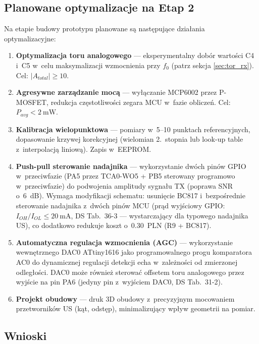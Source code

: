 \documentclass[a4paper,11pt]{article}
\begin{document}
\subsection{Planowane optymalizacje na Etap 2}

Na etapie budowy prototypu planowane są następujące działania optymalizacyjne:

\begin{enumerate}[nosep]
    \item \textbf{Optymalizacja toru analogowego} --- eksperymentalny dobór
          wartości C4 i~C5 w~celu maksymalizacji wzmocnienia przy $f_0$ (patrz
          sekcja \ref{sec:tor_rx}). Cel: $|A_{total}| \geq 10$.
    \item \textbf{Agresywne zarządzanie mocą} --- wyłączanie MCP6002 przez
          P-MOSFET, redukcja częstotliwości zegara MCU w~fazie obliczeń.
          Cel: $P_{avg} < \SI{2}{\milli\watt}$.
    \item \textbf{Kalibracja wielopunktowa} --- pomiary w~5--10 punktach
          referencyjnych, dopasowanie krzywej korekcyjnej (wielomian 2.~stopnia
          lub look-up table z~interpolacją liniową). Zapis w~EEPROM.
    \item \textbf{Push-pull sterowanie nadajnika} --- wykorzystanie dwóch pinów
          GPIO w~przeciwfazie (PA5 przez TCA0-WO5 + PB5 sterowany
          programowo w~przeciwfazie) do podwojenia amplitudy sygnału TX
          (poprawa SNR o~\SI{6}{\deci\bel}). Wymaga modyfikacji schematu:
          usunięcie BC817 i~bezpośrednie sterowanie nadajnika z~dwóch pinów MCU
          (prąd wyjściowy GPIO: $I_{OH}/I_{OL} \leq \SI{20}{\milli\ampere}$,
          DS Tab.~36-3 --- wystarczający dla typowego nadajnika US), co dodatkowo
          redukuje koszt o~\SI{0,30}{PLN} (R9 + BC817).
    \item \textbf{Automatyczna regulacja wzmocnienia (AGC)} --- wykorzystanie
          wewnętrznego DAC0 ATtiny1616 jako programowalnego progu komparatora AC0
          do dynamicznej regulacji detekcji echa w~zależności od zmierzonej
          odległości. DAC0 może również sterować offsetem toru analogowego
          przez wyjście na pin PA6 (jedyny pin z~wyjściem DAC0, DS Tab.~31-2).
    \item \textbf{Projekt obudowy} --- druk 3D obudowy z~precyzyjnym mocowaniem
          przetworników US (kąt, odstęp), minimalizujący wpływ geometrii na pomiar.
\end{enumerate}

\subsection{Wnioski}
\end{document}
